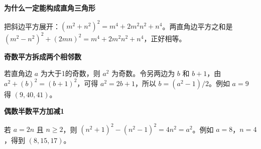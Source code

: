 \clearpage
\begin{explanationbox}
\textbf{\textcolor{CExplanation}{为什么一定能构成直角三角形}}
\par\medskip
\begin{center}

\end{center}
\medskip
把斜边平方展开：$(m^2+n^2)^2=m^4+2m^2n^2+n^4$。两直角边平方之和是 $(m^2-n^2)^2+(2mn)^2=m^4+2m^2n^2+n^4$，正好相等。
\end{explanationbox}
\clearpage
\begin{explanationbox}
\textbf{\textcolor{CExplanation}{奇数平方拆成两个相邻数}}
\par\medskip
\begin{center}

\end{center}
\medskip
若直角边 $a$ 为大于1的奇数，则 $a^2$ 为奇数。令另两边为 $b$ 和 $b+1$，由 $a^2+(b)^2=(b+1)^2$，可得 $a^2=2b+1$，所以 $b=(a^2-1)/2$。例如 $a=9$ 得 $(9,40,41)$。
\end{explanationbox}
\clearpage
\begin{explanationbox}
\textbf{\textcolor{CExplanation}{偶数半数平方加减1}}
\par\medskip
\begin{center}

\end{center}
\medskip
若 $a=2n$ 且 $n\ge2$，则 $(n^2+1)^2-(n^2-1)^2=4n^2=a^2$。例如 $a=8$，$n=4$，得到 $(8,15,17)$。
\end{explanationbox}
